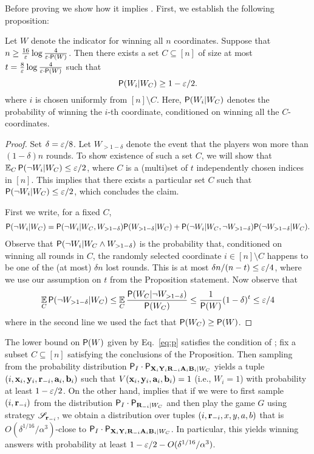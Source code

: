 Before proving  we show how it implies . First, we establish the following proposition:

\begin{proposition}
\label{prop:subset}
	Let $W$ denote the indicator for winning all $n$ coordinates. Suppose that $n \geq \frac{16}{\eps} \log \frac{4}{\eps \cdot \P(W)}$. Then there exists a set $C \subseteq [n]$ of size at most $t = \frac{8}{\eps} \log \frac{4}{\eps \cdot \P(W)}$ such that
	$$
		\P (W_i | W_C) \geq 1 - \eps/2.
	$$
	where $i$ is chosen uniformly from $[n] \setminus C$. Here, $\P(W_i | W_C)$ denotes the probability of winning the $i$-th coordinate, conditioned on winning all the $C$-coordinates.
\end{proposition}
\begin{proof}
	Set $\delta = \eps/8$. Let $W_{> 1 - \delta}$ denote the event that the players won more than $(1 - \delta)n$ rounds. To show existence of such a set $C$, we will show that $\Ex_C \P(\neg W_i | W_C) \leq \eps/2$, where $C$ is a (multi)set of $t$ independently chosen indices in $[n]$. This implies that there exists a particular set $C$ such that $\P(\neg W_i | W_C) \leq \eps/2$, which concludes the claim.
	
	First we write, for a fixed $C$,
	\begin{align*}
		\P ( \neg W_i | W_C) = \P(\neg W_i | W_C, W_{> 1 - \delta}) \P(W_{> 1 - \delta} | W_C) + \P(\neg W_i | W_C, \neg W_{> 1 - \delta}) \P(\neg W_{> 1 - \delta} | W_C).
	\end{align*}
	Observe that $\P(\neg W_i | W_C \wedge W_{> 1 - \delta})$ is the probability that, conditioned on winning all rounds in $C$, the randomly selected coordinate $i \in [n] \setminus C$ happens to be one of the (at most) $\delta n$ lost rounds. This is at most $\delta n/(n - t) \leq \eps/4$, where we use our assumption on $t$ from the Proposition statement. Now observe that 
	\begin{align*}
		\Ex_C \P(\neg W_{> 1 - \delta} | W_C) \leq \Ex_C \frac{\P(W_C | \neg W_{> 1 - \delta})}{\P(W_C)} \leq \frac{1}{\P(W)} (1 - \delta)^t \leq \eps/4
	\end{align*}
	where in the second line we used the fact that $\P(W_C) \geq \P(W)$.	
\end{proof}

The lower bound on $\P(W)$ given by Eq.~\eqref{eq:p} satisfies the condition of ; fix a subset $C \subseteq [n]$ satisfying the conclusions of the Proposition. Then sampling from the probability distribution $\P_I \cdot \P_{\bX_i \bY_i \bR_\mi \bA_i \bB_i | W_C}$ yields a tuple $(i,\bx_i,\by_i,\br_\mi,\ba_i,\bb_i)$ such that $V(\bx_i,\by_i,\ba_i,\bb_i) = 1$ (i.e., $W_i = 1$) with probability at least $1 - \eps/2$. On the other hand,  implies that if we were to first sample $(i,\br_\mi)$ from the distribution $\P_I \cdot \P_{\bR_\mi | W_C}$ and then play the game $G$ using strategy $\strategy_{\br_\mi}$, we obtain a distribution over tuples $(i,\br_\mi,x,y,a,b)$ that is $O(\delta^{1/16}/\alpha^3)$-close to $\P_I \cdot \P_{\bX_i \bY_i \bR_\mi \bA_i \bB_i | W_C}$. In particular, this yields winning answers with probability at least $1 - \eps/2 - O(\delta^{1/16}/\alpha^3)$. 

